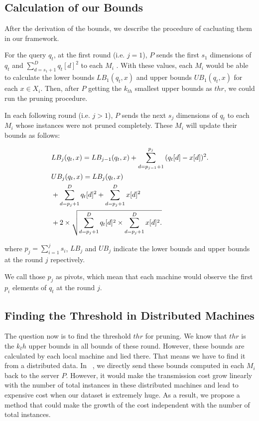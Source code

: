 
\subsection{Calculation of our Bounds} %
\label{sub:calculation_the_bounds}
After the derivation of the bounds, we describe the procedure of cacluating them in our framework.  

For the query $q_t$, at the first round (i.e. $j=1$), $P$ sends the first $s_1$ dimensions of $q_t$ and $\sum^D_{d=s_1+1}{q_t[d]}^2$ to each $M_i$ .  With these values, each $M_i$ would be able to calculate the lower bounds $LB_1(q_t,x)$ and upper bounds $UB_1(q_t,x)$ for each $x\in X_i$.  Then, after $P$ getting the $k_{th}$ smallest upper bounds as $thr$, we could run the pruning procedure.

In each following round (i.e. $j>1$), $P$ sends the next $s_j$ dimensions of $q_t$ to each $M_i$ whose instances were not pruned completely.  These $M_i$ will update their bounds as follows:

\begin{equation}
\begin{aligned}
& LB_j(q_t,x) = LB_{j-1}(q_t,x)+\sum^{p_j}_{d=p_{j-1}+1}{(q_t[d]-x[d])^2}. \\
& UB_j(q_t,x) = LB_{j}(q_t,x) \notag \\
& +  \sum^D_{d=p_j+1}{q_t[d]^2}+\sum^D_{d=p_j+1}{x[d]^2} \notag \\
& + 2 \times \sqrt{\sum^D_{d=p_j+1}{q_t[d]^2}\times \sum^D_{d=p_j+1}{x[d]^2}.}
\end{aligned}
\end{equation}

where $p_j=\sum^j_{i=1}{s_i}$, $LB_j$ and $UB_j$ indicate the lower bounds and upper bounds at the round $j$ repectively.

We call those $p_j$ as pivots, which mean that each machine would observe the first $p_i$ elements of $q_t$ at the round $j$.  

\providecommand{\myceil}[1]{\left \lceil #1 \right \rceil }
\providecommand{\myfloor}[1]{\left \lfloor #1 \right \rfloor }

\subsection{Finding the Threshold in Distributed Machines} %
\label{ss:find_the_threshold_in_distributed_machines}
The question now is to find the threshold $thr$ for pruning. We know that $thr$ is the $k_th$ upper bounds in all bounds of these round. However, these bounds are calculated by each local machine and lied there.  That means we have to find it from a distributed data. In ~\cite{MsWave}, we directly send these bounds computed in each $M_i$ back to the server $P$.  However, it would make the transmission cost grow linearly with the number of total instances in these distributed machines and lead to expensive cost when our dataset is extremely huge.  As a result, we propose a method that could make the growth of the cost independent with the number of total instances.

